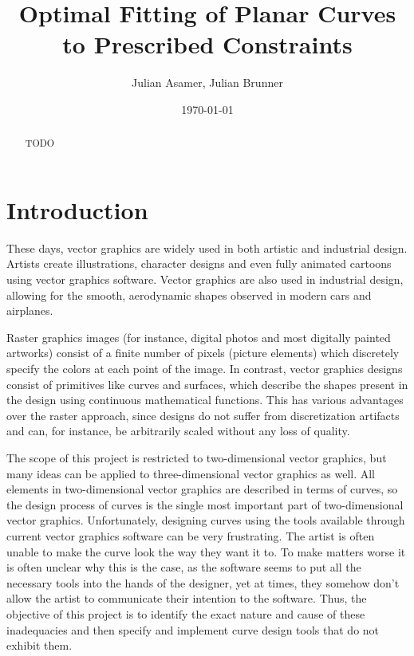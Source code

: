 \documentclass[a4paper]{article}
\title{Optimal Fitting of Planar Curves to Prescribed Constraints}
\author{Julian Asamer, Julian Brunner}
\date{\today}
\begin{document}
	\maketitle

	\begin{abstract}

		\noindent TODO

	\end{abstract}

	\section{Introduction}
	\label{section:introduction}

		These days, vector graphics are widely used in both artistic and industrial design. Artists create illustrations, character designs and even fully animated cartoons using vector graphics software. Vector graphics are also used in industrial design, allowing for the smooth, aerodynamic shapes observed in modern cars and airplanes.

		Raster graphics images (for instance, digital photos and most digitally painted artworks) consist of a finite number of pixels (picture elements) which discretely specify the colors at each point of the image. In contrast, vector graphics designs consist of primitives like curves and surfaces, which describe the shapes present in the design using continuous mathematical functions. This has various advantages over the raster approach, since designs do not suffer from discretization artifacts and can, for instance, be arbitrarily scaled without any loss of quality.

		The scope of this project is restricted to two-dimensional vector graphics, but many ideas can be applied to three-dimensional vector graphics as well. All elements in two-dimensional vector graphics are described in terms of curves, so the design process of curves is the single most important part of two-dimensional vector graphics. Unfortunately, designing curves using the tools available through current vector graphics software can be very frustrating. The artist is often unable to make the curve look the way they want it to. To make matters worse it is often unclear why this is the case, as the software seems to put all the necessary tools into the hands of the designer, yet at times, they somehow don't allow the artist to communicate their intention to the software. Thus, the objective of this project is to identify the exact nature and cause of these inadequacies and then specify and implement curve design tools that do not exhibit them.
\end{document}
